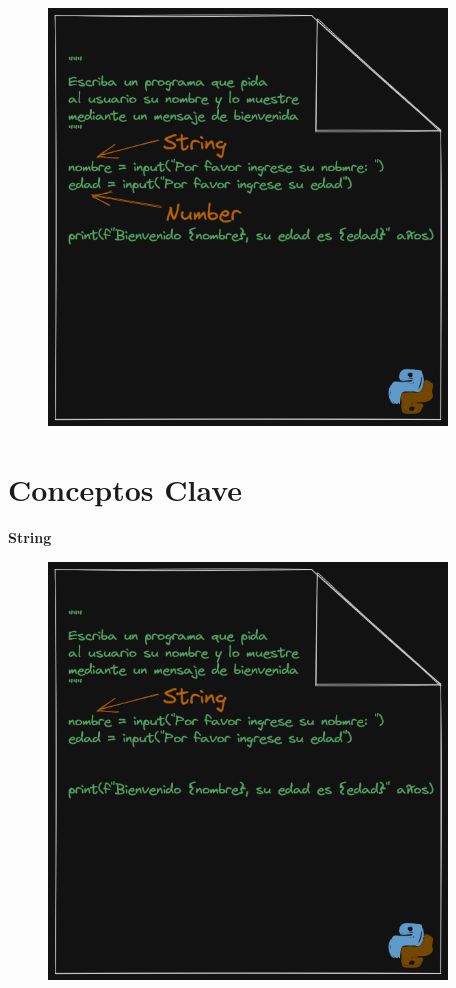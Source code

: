 \documentclass[
  a4paper,
  DIV=11,
  numbers=noendperiod,
  onepage,
  openany]{scrreprt}
\begin{document}
\begin{figure}

{\centering \includegraphics[width=4.16667in,height=\textheight]{unidades/unidad3/images/stringAndNumber.png}

}

\end{figure}

\section{Conceptos Clave}\label{conceptos-clave-7}

\textbf{String}

\begin{figure}

{\centering \includegraphics[width=4.16667in,height=\textheight]{unidades/unidad3/images/string-4.png}

}

\end{figure}
\end{document}

